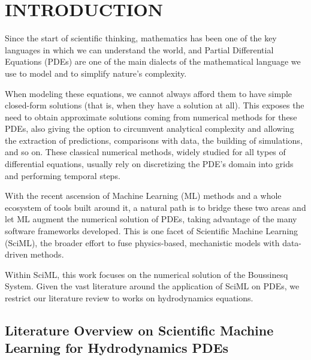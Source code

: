 \chapter{INTRODUCTION}
\label{chap:intro}




Since the start of scientific thinking, mathematics has been one of the key languages in which we can understand the world, and Partial Differential Equations (PDEs) are one of the main dialects of the mathematical language we use to model and to simplify nature's complexity.

When modeling these equations, we cannot always afford them to have simple closed-form solutions (that is, when they have a solution at all). This exposes the need to obtain approximate solutions coming from numerical methods for these PDEs, also giving the option to circumvent analytical complexity and allowing the extraction of predictions, comparisons with data, the building of simulations, and so on. These classical numerical methods, widely studied for all types of differential equations, usually rely on discretizing the PDE's domain into grids and performing temporal steps.

With the recent ascension of Machine Learning (ML) methods and a whole ecosystem of tools built around it, a natural path is to bridge these two areas and let ML augment the numerical solution of PDEs, taking advantage of the many software frameworks developed. This is one facet of Scientific Machine Learning (SciML), the broader effort to fuse physics-based, mechanistic models with data-driven methods.

Within SciML, this work focuses on the numerical solution of the Boussinesq System. Given the vast literature around the application of SciML on PDEs, we restrict our literature review to works on hydrodynamics equations.

\section{Literature Overview on Scientific Machine Learning for Hydrodynamics PDEs}
\label{sec:intro_sciML}

